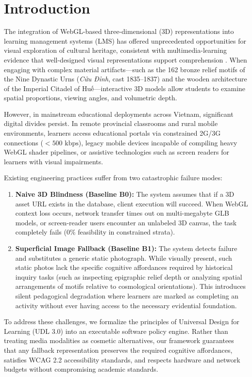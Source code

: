 \documentclass[11pt,a4paper]{article}
\begin{document}
\section{Introduction}

The integration of WebGL-based three-dimensional (3D) representations into learning management systems (LMS) has offered unprecedented opportunities for visual exploration of cultural heritage, consistent with multimedia-learning evidence that well-designed visual representations support comprehension \cite{mayer2002multimedia}. When engaging with complex material artifacts---such as the 162 bronze relief motifs of the Nine Dynastic Urns (\textit{Cửu Đỉnh}, cast 1835--1837) and the wooden architecture of the Imperial Citadel of Huế---interactive 3D models allow students to examine spatial proportions, viewing angles, and volumetric depth.

However, in mainstream educational deployments across Vietnam, significant digital divides persist. In remote provincial classrooms and rural mobile environments, learners access educational portals via constrained 2G/3G connections ($< 500\text{ kbps}$), legacy mobile devices incapable of compiling heavy WebGL shader pipelines, or assistive technologies such as screen readers for learners with visual impairments. 

Existing engineering practices suffer from two catastrophic failure modes:
\begin{enumerate}
    \item \textbf{Naive 3D Blindness (Baseline B0):} The system assumes that if a 3D asset URL exists in the database, client execution will succeed. When WebGL context loss occurs, network transfer times out on multi-megabyte GLB models, or screen-reader users encounter an unlabeled 3D canvas, the task completely fails ($0\%$ feasibility in constrained strata).
    \item \textbf{Superficial Image Fallback (Baseline B1):} The system detects failure and substitutes a generic static photograph. While visually present, such static photos lack the specific cognitive affordances required by historical inquiry tasks (such as inspecting epigraphic relief depth or analyzing spatial arrangements of motifs relative to cosmological orientations). This introduces silent pedagogical degradation where learners are marked as completing an activity without ever having access to the necessary evidential foundation.
\end{enumerate}

To address these challenges, we formalize the principles of Universal Design for Learning (UDL 3.0) into an executable software policy engine. Rather than treating media modalities as cosmetic alternatives, our framework guarantees that any fallback representation preserves the required cognitive affordances, satisfies WCAG 2.2 accessibility standards, and respects hardware and network budgets without compromising academic standards.
\end{document}

